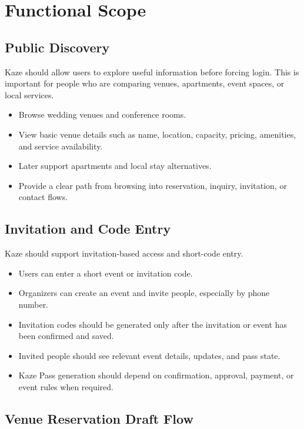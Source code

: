 \documentclass[11pt,a4paper]{article}
\begin{document}
\section{Functional Scope}

\subsection{Public Discovery}

Kaze should allow users to explore useful information before forcing login. This is important for people who are comparing venues, apartments, event spaces, or local services.

\begin{itemize}
    \item Browse wedding venues and conference rooms.
    \item View basic venue details such as name, location, capacity, pricing, amenities, and service availability.
    \item Later support apartments and local stay alternatives.
    \item Provide a clear path from browsing into reservation, inquiry, invitation, or contact flows.
\end{itemize}

\subsection{Invitation and Code Entry}

Kaze should support invitation-based access and short-code entry.

\begin{itemize}
    \item Users can enter a short event or invitation code.
    \item Organizers can create an event and invite people, especially by phone number.
    \item Invitation codes should be generated only after the invitation or event has been confirmed and saved.
    \item Invited people should see relevant event details, updates, and pass state.
    \item Kaze Pass generation should depend on confirmation, approval, payment, or event rules when required.
\end{itemize}

\subsection{Venue Reservation Draft Flow}
\end{document}
